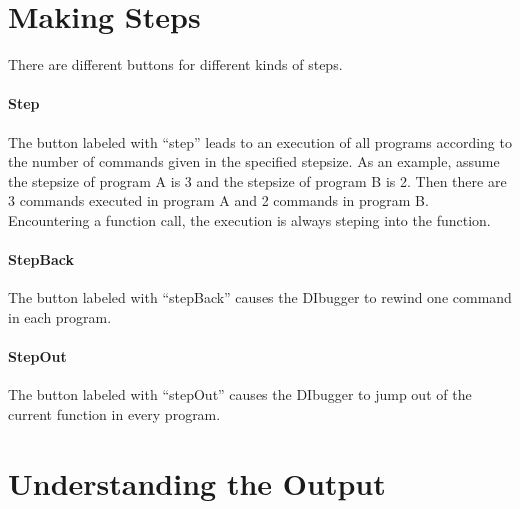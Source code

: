 \documentclass[parskip=full]{memoir}
\begin{document}
\section{Making Steps}
There are different buttons for different kinds of steps.
\paragraph{Step}
The button labeled with \enquote{step} leads to an execution of all programs according to the number of commands given in the specified stepsize. As an example, assume the stepsize of program A is 3 and the stepsize of program B is 2. Then there are 3 commands executed in program A and 2 commands in program B. Encountering a function call, the execution is always steping into the function.
\paragraph{StepBack}
The button labeled with \enquote{stepBack} causes the DIbugger to rewind one command in each program.
\paragraph{StepOut}
The button labeled with \enquote{stepOut} causes the DIbugger to jump out of the current function in every program.
\section{Understanding the Output}
\end{document}

